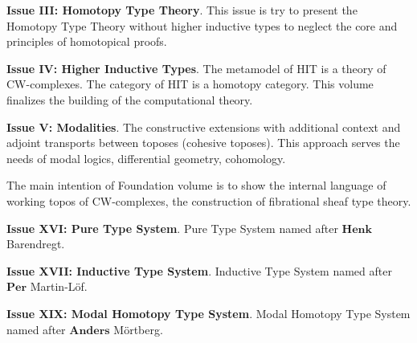 \documentclass{article}
\theoremstyle{definition}
\begin{document}
{\bf Issue III: Homotopy Type Theory}.
This issue is try to present the Homotopy Type Theory without higher inductive types
to neglect the core and principles of homotopical proofs.

{\bf Issue IV: Higher Inductive Types}.
The metamodel of HIT is a theory of CW-complexes. The category of HIT is a homotopy category.
This volume finalizes the building of the computational theory.

{\bf Issue V: Modalities}. The constructive extensions with additional context and
adjoint transports between toposes (cohesive toposes). This approach serves the needs
of modal logics, differential geometry, cohomology.

The main intention of Foundation volume is to show the internal language
of working topos of CW-complexes, the construction of fibrational sheaf type theory.

{\bf Issue XVI: Pure Type System}. Pure Type System named after $\mathbf{Henk}$ Barendregt.

{\bf Issue XVII: Inductive Type System}. Inductive Type System named after $\mathbf{Per}$ Martin-L\"{o}f.

{\bf Issue XIX: Modal Homotopy Type System}. Modal Homotopy Type System named after $\mathbf{Anders}$ M\"{o}rtberg.

\newpage



\newpage
\end{document}
